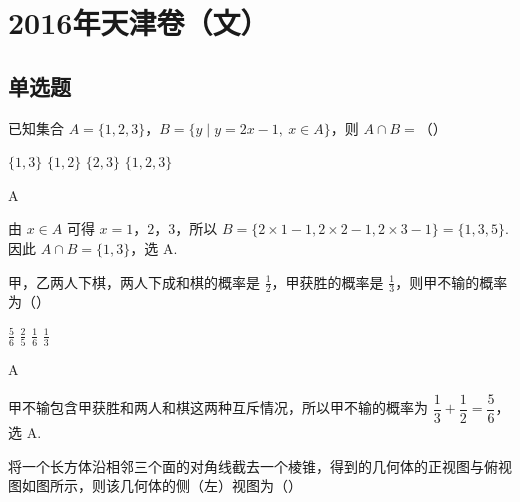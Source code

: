 \chapter{2016年天津卷（文）}

\section{单选题}

\begin{problem}
已知集合 \( A=\{1,2,3\} \)，\( B=\{y\mid y=2x-1,\ x\in A\} \)，则 \( A\cap B=\)（\quad）

\choices
    {\(\{1,3\}\)}
    {\(\{1,2\}\)}
    {\(\{2,3\}\)}
    {\(\{1,2,3\}\)}
\end{problem}

\begin{answer}
A
\end{answer}

\begin{solution}
由 \(x\in A\) 可得 \(x=1\)，\(2\)，\(3\)，所以
\(B=\{2\times1-1,2\times2-1,2\times3-1\}=\{1,3,5\}\). 因此
\(A\cap B=\{1,3\}\)，选 A.
\end{solution}

\begin{problem}
甲，乙两人下棋，两人下成和棋的概率是 \( \frac12 \)，甲获胜的概率是 \( \frac13 \)，则甲不输的概率为（\quad）

\choices
    {\(\frac56\)}
    {\(\frac25\)}
    {\(\frac16\)}
    {\(\frac13\)}
\end{problem}

\begin{answer}
A
\end{answer}

\begin{solution}
甲不输包含甲获胜和两人和棋这两种互斥情况，所以甲不输的概率为
\(\dfrac13+\dfrac12=\dfrac56\)，选 A.
\end{solution}

\begin{problem}
将一个长方体沿相邻三个面的对角线截去一个棱锥，得到的几何体的正视图与俯视图如图所示，则该几何体的侧（左）视图为（\quad）


    {}
    {}
    {}
\end{problem}


